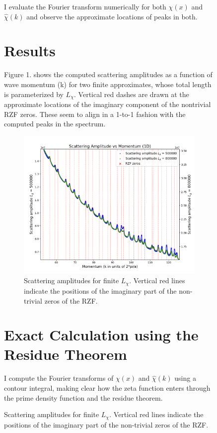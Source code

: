 \documentclass[11pt, oneside]{article}
\begin{document}
\begin{figure}[htbp]
\begin{center}
I evaluate the Fourier transform numerically for both $\chi(x)$ and $\hat{\chi}(k)$ and observe the approximate locations of peaks in both.
 
 \section{Results}
 Figure 1. shows the computed scattering amplitudes as a function of wave momentum (k) for two finite approximates, whose total length is parameterized by $L_{\chi}$. Vertical red dashes are drawn at the approximate locations of the imaginary component of the nontrivial RZF zeros. These seem to align in a 1-to-1 fashion with the computed peaks in the spectrum.
 
\begin{figure}[htbp]
\begin{center}
    \includegraphics[width=0.8\linewidth]{../images/zoomed_scattering.png}
   
\caption{Scattering amplitudes for finite $L_{\chi}$. Vertical red lines indicate the positions of the imaginary part of the non-trivial zeros of the RZF.}
\label{default}
\end{center}
\end{figure}
 
\section{Exact Calculation using the Residue Theorem}

I compute the Fourier transforms of $\chi(x)$ and $\hat{\chi}(k)$ using a contour integral, making clear how the zeta function enters through the prime density function and the residue theorem.


\end{center}
\end{figure}
\end{document}

